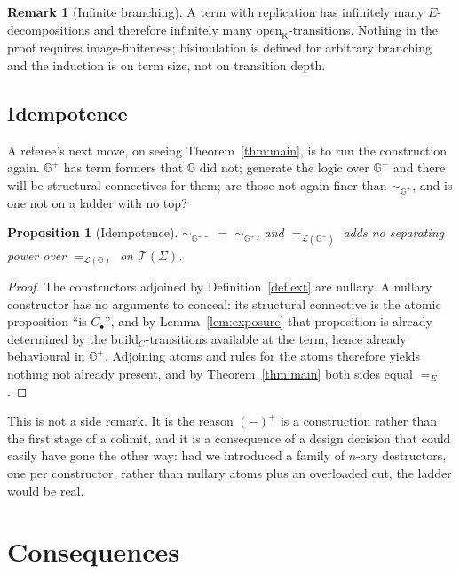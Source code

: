 \documentclass[11pt]{article}
\theoremstyle{plain}
\newtheorem{proposition}[theorem]{Proposition}
\theoremstyle{definition}
\newtheorem{remark}[theorem]{Remark}
\newcommand{\Kc}{\mathsf{K}}
\newcommand{\Gg}{\mathbb{G}}
\newcommand{\Lo}{\mathcal{L}}
\newcommand{\op}{\mathrm{open}}
\newcommand{\bd}{\mathrm{build}}
\newcommand{\bis}{\sim}
\newcommand{\Terms}{\mathcal{T}}
\begin{document}
\begin{remark}[Infinite branching]
A term with replication has infinitely many $E$-decompositions and therefore infinitely many
$\op_\Kc$-transitions. Nothing in the proof requires image-finiteness; bisimulation is defined for
arbitrary branching and the induction is on term size, not on transition depth.
\end{remark}

\subsection{Idempotence}
\label{sec:idempotent}

A referee's next move, on seeing Theorem~\ref{thm:main}, is to run the construction again. $\Gg^+$ has
term formers that $\Gg$ did not; generate the logic over $\Gg^+$ and there will be structural
connectives for them; are those not again finer than $\bis_{\Gg^+}$, and is one not on a ladder with no
top?

\begin{proposition}[Idempotence]
\label{prop:idem}
$\bis_{\Gg^{++}} \;=\; \bis_{\Gg^+}$, and $=_{\Lo(\Gg^+)}$ adds no separating power over
$=_{\Lo(\Gg)}$ on $\Terms(\Sigma)$.
\end{proposition}

\begin{proof}
The constructors adjoined by Definition~\ref{def:ext} are nullary. A nullary constructor has no
arguments to conceal: its structural connective is the atomic proposition ``is $C_\bullet$'', and by
Lemma~\ref{lem:exposure} that proposition is already determined by the $\bd_C$-transitions available
at the term, hence already behavioural in $\Gg^+$. Adjoining atoms and rules for the atoms therefore
yields nothing not already present, and by Theorem~\ref{thm:main} both sides equal $=_E$.
\end{proof}

This is not a side remark. It is the reason $(-)^+$ is a construction rather than the first stage of a
colimit, and it is a consequence of a design decision that could easily have gone the other way: had
we introduced a family of $n$-ary destructors, one per constructor, rather than nullary atoms plus an
overloaded cut, the ladder would be real.

\section{Consequences}
\label{sec:consequences}
\end{document}

